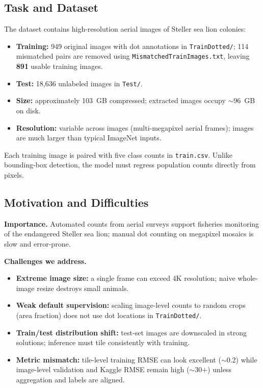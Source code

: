 \documentclass[12pt, a4paper]{article}
\begin{document}
\subsection{Task and Dataset}
The dataset contains high-resolution aerial images of Steller sea lion colonies:
\begin{itemize}
    \item \textbf{Training:} 949 original images with dot annotations in \texttt{TrainDotted/}; 114 mismatched pairs are removed using \texttt{MismatchedTrainImages.txt}, leaving \textbf{891} usable training images.
    \item \textbf{Test:} 18,636 unlabeled images in \texttt{Test/}.
    \item \textbf{Size:} approximately 103~GB compressed; extracted images occupy $\sim$96~GB on disk.
    \item \textbf{Resolution:} variable across images (multi-megapixel aerial frames); images are much larger than typical ImageNet inputs.
\end{itemize}

Each training image is paired with five class counts in \texttt{train.csv}. Unlike bounding-box detection, the model must regress population counts directly from pixels.

\subsection{Motivation and Difficulties}
\textbf{Importance.} Automated counts from aerial surveys support fisheries monitoring of the endangered Steller sea lion; manual dot counting on megapixel mosaics is slow and error-prone.

\textbf{Challenges we address.}
\begin{itemize}
    \item \textbf{Extreme image size:} a single frame can exceed 4K resolution; naive whole-image resize destroys small animals.
    \item \textbf{Weak default supervision:} scaling image-level counts to random crops (area fraction) does not use dot locations in \texttt{TrainDotted/}.
    \item \textbf{Train/test distribution shift:} test-set images are downscaled in strong solutions; inference must tile consistently with training.
    \item \textbf{Metric mismatch:} tile-level training RMSE can look excellent ($\sim$0.2) while image-level validation and Kaggle RMSE remain high ($\sim$30+) unless aggregation and labels are aligned.
\end{itemize}
\end{document}
